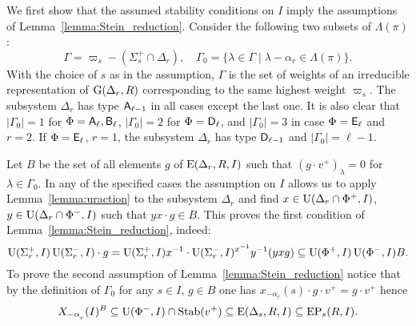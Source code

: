 
We first show that the assumed stability conditions on $I$ imply the assumptions of Lemma~\ref{lemma:Stein_reduction}.
Consider the following two subsets of $\Lambda(\pi)$:
$$\Gamma = \varpi_s- (\Sigma_s^+\cap \Delta_r),\quad \Gamma_0 = \{\lambda \in \Gamma \mid \lambda - \alpha_r \in \Lambda(\pi) \}.$$
With the choice of $s$ as in the assumption, $\Gamma$ is the set of weights of an irreducible representation of $\operatorname{G}(\Delta_r, R)$ corresponding to the same highest weight $\varpi_s$.
The subsystem $\Delta_r$ has type $\mathsf{A}_{\ell-1}$ in all cases except the last one.
It is also clear that $|\Gamma_0|=1$ for $\Phi=\mathsf{A}_\ell, \mathsf{B}_\ell$, $|\Gamma_0|=2$ for $\Phi=\mathsf{D}_\ell$, and $|\Gamma_0|=3$ in case $\Phi=\mathsf{E}_\ell$ and $r=2$.
If $\Phi=\mathsf{E}_\ell$, $r=1$, the subsystem $\Delta_r$ has type $\mathsf{D}_{\ell-1}$ and $|\Gamma_0|=\ell-1$.

Let $B$ be the set of all elements $g$ of $\operatorname{E}(\Delta_r,R, I)$ such that $(g \cdot v^+)_\lambda = 0$ for $\lambda\in\Gamma_0$.
In any of  the specified cases the assumption on $I$ allows us to apply Lemma~\ref{lemma:uraction} to the subsystem $\Delta_r$ and find
$x\in\operatorname{U}(\Delta_r\cap\Phi^+, I)$, $y\in \operatorname{U}(\Delta_r\cap\Phi^-, I)$ such that $yx\cdot g \in B$.
This proves the first condition of Lemma~\ref{lemma:Stein_reduction}, indeed:
\[ \operatorname{U}(\Sigma^+_r, I) \operatorname{U}(\Sigma^-_r, I) \cdot g = \operatorname{U}(\Sigma^+_r, I) x^{-1} \cdot \operatorname{U}(\Sigma^-_r, I)^{x^{-1}} y^{-1} (yxg) \subseteq \operatorname{U}(\Phi^+, I) \operatorname{U}(\Phi^-, I) B. \]
To prove the second assumption of Lemma~\ref{lemma:Stein_reduction} notice that by the definition of $\Gamma_0$ for any $s\in I$, $ g\in B$ one has $x_{-\alpha_r}(s) \cdot g \cdot v^+ = g \cdot v^+$ hence
\[ X_{-\alpha\ssub{r}}(I)^{B} \subseteq \U(\Phi^-, I) \cap \Stab(v^+) \subseteq \E(\Delta_s, R, I) \subseteq \EP_s(R, I). \]

